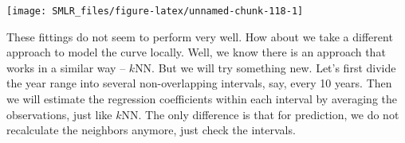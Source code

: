 \documentclass[
]{book}
\newenvironment{Shaded}{\begin{snugshade}}{\end{snugshade}}
\newcommand{\AttributeTok}[1]{\textcolor[rgb]{0.13,0.29,0.53}{#1}}
\newcommand{\ConstantTok}[1]{\textcolor[rgb]{0.56,0.35,0.01}{#1}}
\newcommand{\ControlFlowTok}[1]{\textcolor[rgb]{0.13,0.29,0.53}{\textbf{#1}}}
\newcommand{\DecValTok}[1]{\textcolor[rgb]{0.00,0.00,0.81}{#1}}
\newcommand{\FunctionTok}[1]{\textcolor[rgb]{0.13,0.29,0.53}{\textbf{#1}}}
\newcommand{\NormalTok}[1]{#1}
\newcommand{\OtherTok}[1]{\textcolor[rgb]{0.56,0.35,0.01}{#1}}
\newcommand{\SpecialCharTok}[1]{\textcolor[rgb]{0.81,0.36,0.00}{\textbf{#1}}}
\newcommand{\StringTok}[1]{\textcolor[rgb]{0.31,0.60,0.02}{#1}}
\theoremstyle{definition}
\theoremstyle{definition}
\theoremstyle{definition}
\theoremstyle{definition}
\theoremstyle{remark}
\begin{document}
\begin{center}\texttt{[image: SMLR\_files/figure-latex/unnamed-chunk-118-1]} \end{center}

These fittings do not seem to perform very well. How about we take a different approach to model the curve locally. Well, we know there is an approach that works in a similar way -- \(k\)NN. But we will try something new. Let's first divide the year range into several non-overlapping intervals, say, every 10 years. Then we will estimate the regression coefficients within each interval by averaging the observations, just like \(k\)NN. The only difference is that for prediction, we do not recalculate the neighbors anymore, just check the intervals.

\begin{Shaded}
\end{Shaded}
\end{document}

